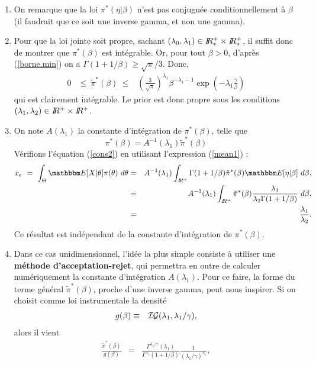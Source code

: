 \begin{enumerate}
\item On remarque que la loi $\pi^*(\eta|\beta)$ n'est pas conjuguée conditionnellement à $\beta$ (il faudrait que ce soit une inverse gamma, et non une gamma). 
\item Pour que la loi jointe soit propre, sachant $(\lambda_0,\lambda_1)\in I\!\!R^+_*\times I\!\!R^+_*$, il suffit donc de montrer que $\pi^*(\beta)$ est intégrable. Or, pour tout $\beta>0$, d'après (\ref{borne.min}) on a $\Gamma(1+1/\beta)\geq \sqrt{\pi}/{3}$. Donc,  
\begin{eqnarray*}
0 & \leq \ \tilde{\pi}^*(\beta) \ \leq & \left(\frac{3}{\sqrt{\pi}}\right)^{\lambda_1} \beta^{-\lambda_1-1} \exp\left(-\lambda_1 \frac{\gamma}{\beta}\right)
\end{eqnarray*}
qui est clairement intégrable. Le prior est donc propre sous les conditions $(\lambda_1,\lambda_2)\in I\!\!R^+\times I\!\!R^+$. 
\item On note $A(\lambda_1)$ la constante d'intégration de $\pi^*(\beta)$, telle que
$$
\pi^*(\beta) = A^{-1}(\lambda_1)\tilde{\pi}^*(\beta)
$$
Vérifions l'équation (\ref{cons2}) en utilisant l'expression (\ref{mean1}) : 
\begin{eqnarray*}
x_e \ = \ \int_{\Theta} \E[X|\theta] \pi(\theta)  \ d\theta & = &  A^{-1}(\lambda_1) \int_{\R^+} \Gamma(1+1/\beta) \tilde{\pi}^*(\beta)\E[\eta|\beta] \ d\beta, \\
& = & A^{-1}(\lambda_1) \int_{\R^+}  \tilde{\pi}^*(\beta) \frac{\lambda_1}{\lambda_2 \Gamma(1+1/\beta)} \ d\beta, \\
& = & \frac{\lambda_1}{\lambda_2}.
\end{eqnarray*}
Ce résultat est indépendant de la constante d'intégration de $\pi^*(\beta)$.
\item Dans ce cas unidimensionnel, l'idée la plus simple consiste à utiliser une {\bf méthode d'acceptation-rejet}, qui permettra en outre de calculer numériquement la constante d'intégration  $A(\lambda_1)$. Pour ce faire, la forme du terme général $\tilde{\pi}^*(\beta)$, proche d'une inverse gamma, peut nous inspirer. Si on choisit comme loi instrumentale la densité
\begin{eqnarray*}
g(\beta) & \equiv & {\cal{IG}}(\lambda_1,\lambda_1/\gamma),
\end{eqnarray*}
alors il vient
\begin{eqnarray*}
\frac{\tilde{\pi}^*(\beta)}{g(\beta)} & = & \frac{\Gamma^{\lambda_1/\gamma}(\lambda_1)}{\Gamma^{\lambda_1}(1+1/\beta)}\frac{1}{\left(\lambda_1/\gamma\right)^{\lambda_1}}, \\

\end{eqnarray*}
\end{enumerate}
